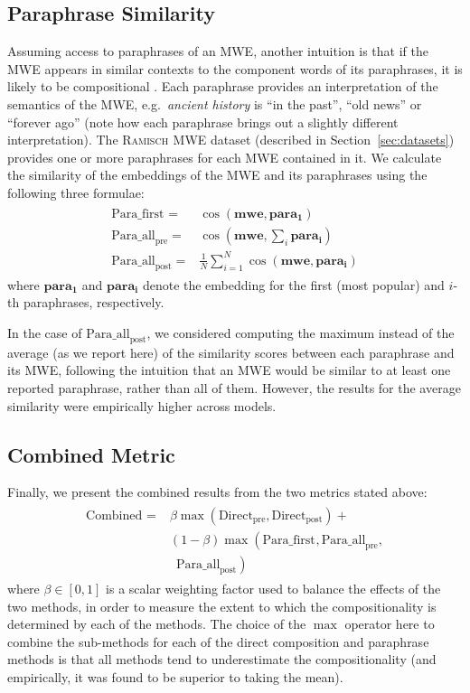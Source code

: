 \documentclass[11pt,a4paper]{article}
\newcommand{\lex}[1]{\textit{#1}\xspace}
\newcommand{\gloss}[1]{``#1''\xspace}
\newcommand{\dataset}[2][]{\textsc{#2}$_{\text{#1}}$\xspace}
\newcommand{\ramisch}{\dataset{Ramisch}}
\newcommand{\method}[2][]{\ensuremath{\text{#2}_{\text{#1}}}\xspace}
\newcommand{\presum}{\method[pre]{Direct}}
\newcommand{\postsum}{\method[post]{Direct}}
\newcommand{\firstpara}{\method{Para\_first}}
\newcommand{\avgparapre}{\method[pre]{Para\_all}}
\newcommand{\avgparapost}{\method[post]{Para\_all}}
\newcommand{\combined}{\method{Combined}}
\newcommand{\MWEvec}{\ensuremath{\mathbf{mwe}}\xspace}
\newcommand{\paravec}[1][]{\ensuremath{\mathbf{para_{#1}}}\xspace}
\newcommand{\secref}[2][]{Section#1~\ref{#2}\xspace}
\begin{document}
\subsection{Paraphrase Similarity}
\label{sec:paraphrase}

Assuming access to paraphrases of an MWE, another intuition is that if the MWE appears in similar contexts to the component words of its paraphrases, it is likely to be compositional \cite{Shwartz2018}. Each paraphrase provides an interpretation of the semantics of the MWE, e.g.\ \lex{ancient history} is \gloss{in the past}, \gloss{old news} or \gloss{forever ago} (note how each paraphrase brings out a slightly different interpretation). The \ramisch MWE dataset (described in \secref{sec:datasets}) provides one or more paraphrases for each MWE contained in it. We calculate the similarity of the embeddings of the MWE and its paraphrases using the following three formulae:
\begin{eqnarray*}
  \begin{split}
\firstpara = & \cos(\MWEvec, \paravec[1])\\
\avgparapre = & \cos(\MWEvec, \sum_i \paravec[i])\\
\avgparapost = & \frac{1}{N} \sum_{i=1}^N \cos(\MWEvec, \paravec[i])
  \end{split}
\end{eqnarray*}
where \paravec[1] and \paravec[i] denote the embedding for the first (most popular) and $i$-th paraphrases, respectively.

In the case of \avgparapost, we considered computing the maximum instead of the average (as we report here) of the similarity scores between each paraphrase and its MWE, following the intuition that an MWE would be similar to at least one reported paraphrase, rather than all of them. However, the results for the average similarity were empirically higher across models.

\subsection{Combined Metric}
\label{sec:combined}

Finally, we present the combined results from the two metrics stated above:
\begin{eqnarray*}
  \begin{split}
    \combined = & \beta\max\left(\presum, \postsum\right) + \\
    & (1 - \beta)\max\left(\firstpara, \avgparapre, \right.\\
    & \,\,\,\left.\avgparapost\right)
  \end{split}
\end{eqnarray*}
where $\beta\in[0,1]$ is a scalar weighting factor used to balance the effects of the two methods, in order to measure the extent to which the compositionality is determined by each of the methods. The choice of the $\max$ operator here to combine the sub-methods for each of the direct composition and paraphrase methods is that all methods tend to underestimate the compositionality (and empirically, it was found to be superior to taking the mean).
\end{document}
